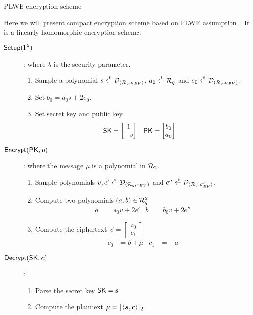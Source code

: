 \begin{subsection}{PLWE encryption scheme~\cite{DBLP:conf/eurocrypt/LyubashevskyPR13}\label{PLWE}}

  Here we will present compact encryption scheme based on PLWE assumption~\cite{DBLP:conf/eurocrypt/LyubashevskyPR13}.
  It is a linearly homomorphic encryption scheme.

  \begin{description}
  \item[${\mathsf{Setup}}(1^\lambda)$]: where $\lambda$ is the security parameter.
    \begin{enumerate}
    \item Sample a polynomial $s \stackrel{{\scriptscriptstyle \mkern4mu \$}}{\gets} \mathcal{D}_{({\mathcal{R}}_q, \sigma_{BV})}$, $a_0 \stackrel{{\scriptscriptstyle \mkern4mu \$}}{\gets} {\mathcal{R}}_q$ and $e_0 \stackrel{{\scriptscriptstyle \mkern4mu \$}}{\gets} \mathcal{D}_{({\mathcal{R}}_q, \sigma_{BV})}$.
    \item Set $b_0 = a_0 s + 2 e_0$.
    \item Set secret key and public key
      \begin{align*}
        \mathsf{SK} &= \begin{bmatrix} 1 \\ -s\end{bmatrix} & \mathsf{PK} &= \begin{bmatrix} b_0 \\ a_0\end{bmatrix}
      \end{align*}
    \end{enumerate}
  \item[${\mathsf{Encrypt}}(\mathsf{PK}, \mu)$]: where the message $\mu$ is a polynomial in ${\mathcal{R}}_2$.
    \begin{enumerate}
    \item Sample polynomials $v,e' \stackrel{{\scriptscriptstyle \mkern4mu \$}}{\gets} \mathcal{D}_{({\mathcal{R}}_q, \sigma_{BV})}$ and $e'' \stackrel{{\scriptscriptstyle \mkern4mu \$}}{\gets}  \mathcal{D}_{({\mathcal{R}}_q, \sigma_{BV}')}$.
    \item Compute two polynomials $(a, b) \in {\mathcal{R}}_q^2$
      \begin{align*}
        a &= a_0 v + 2 e' & b &= b_0 v +2 e''
      \end{align*}
    \item Compute the ciphertext $\vec{c} = \begin{bmatrix} c_0 \\ c_1\end{bmatrix}$
      \begin{align*}
        c_0 &= b + \mu & c_1 &= -a
      \end{align*}
    \end{enumerate}
  \item[$\Dec(\SK, \vec{c})$]:
    \begin{enumerate}
    \item Parse the secret key $\SK = \vec{s}$
    \item Compute the plaintext $\mu = \round{\langle \vec{s}, \vec{c}\rangle}_2$
    \end{enumerate}
  \end{description}
\end{subsection}



